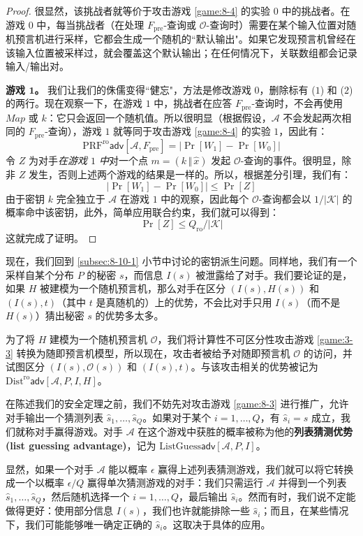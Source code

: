 \begin{proof}
\vspace{5pt}

\noindent
很显然，该挑战者就等价于攻击游戏 \ref{game:8-4} 的实验 $0$ 中的挑战者。在游戏 $0$ 中，每当挑战者（在处理 $F_\mathrm{pre}$-查询或 $\mathcal{O}$-查询时）需要在某个输入位置对随机预言机进行采样，它都会生成一个随机的``默认输出"。如果它发现预言机曾经在该输入位置被采样过，就会覆盖这个默认输出；在任何情况下，关联数组都会记录输入/输出对。

\vspace{5pt}

\noindent\textbf{游戏 $\mathbf{1}$。}
我们让我们的侏儒变得``健忘"，方法是修改游戏 $0$，删除标有 ($1$) 和 ($2$) 的两行。现在观察一下，在游戏 $1$ 中，挑战者在应答 $F_\mathrm{pre}$-查询时，不会再使用 $Map$ 或 $k$：它只会返回一个随机值。所以很明显（根据假设，$\mathcal{A}$ 不会发起两次相同的 $F_\mathrm{pre}$-查询），游戏 $1$ 就等同于攻击游戏 \ref{game:8-4} 的实验 $1$，因此有：
\[
\mathrm{PRF}^\mathrm{ro}\mathsf{adv}[\mathcal{A},F_\mathrm{pre}]=
\big\lvert
\Pr[W_1]-\Pr[W_0]
\big\rvert
\]
令 $Z$ 为对手\emph{在游戏 $1$ 中}对一个点 $m=(k\,\Vert\,\hat{x})$ 发起 $\mathcal{O}$-查询的事件。很明显，除非 $Z$ 发生，否则上述两个游戏的结果是一样的。所以，根据差分引理，我们有：
\[
\big\lvert
\Pr[W_1]-\Pr[W_0]
\big\rvert
\leq\Pr[Z]
\]
由于密钥 $k$ 完全独立于 $\mathcal{A}$ 在游戏 $1$ 中的观察，因此每个 $\mathcal{O}$-查询都会以 $1/|\mathcal{K}|$ 的概率命中该密钥，此外，简单应用联合约束，我们就可以得到：
\[
\Pr[Z]\leq
Q_\mathrm{ro}/|\mathcal{K}|
\]
这就完成了证明。
\end{proof}

\begin{snote}[随机预言机模型下的密钥派生。]
现在，我们回到 \ref{subsec:8-10-1} 小节中讨论的密钥派生问题。同样地，我们有一个采样自某个分布 $P$ 的秘密 $s$，而信息 $I(s)$ 被泄露给了对手。我们要论证的是，如果 $H$ 被建模为一个随机预言机，那么对手在区分 $(I(s),H(s))$ 和 $(I(s),t)$（其中 $t$ 是真随机的）上的优势，不会比对手只用 $I(s)$（而不是 $H(s)$）猜出秘密 $s$ 的优势多太多。

为了将 $H$ 建模为一个随机预言机 $\mathcal{O}$，我们将计算性不可区分性攻击游戏 \ref{game:3-3} 转换为随即预言机模型，所以现在，攻击者被给予对随即预言机 $\mathcal{O}$ 的访问，并试图区分 $(I(s),\mathcal{O}(s))$ 和 $(I(s),t)$。与该攻击相关的优势被记为 $\mathrm{Dist}^\mathrm{ro}\mathsf{adv}[\mathcal{A},P,I,H]$。

在陈述我们的安全定理之前，我们不妨先对攻击游戏 \ref{game:8-3} 进行推广，允许对手输出一个猜测列表 $\hat{s}_1,\dots,\hat{s}_Q$。如果对于某个 $i=1,\dots,Q$，有 $\hat{s}_i=s$ 成立，我们就称对手赢得游戏。对手 $\mathcal{A}$ 在这个游戏中获胜的概率被称为他的\textbf{列表猜测优势(list guessing advantage)}，记为 $\mathrm{ListGuess}\mathsf{adv}[\mathcal{A},P,I]$。

显然，如果一个对手 $\mathcal{A}$ 能以概率 $\epsilon$ 赢得上述列表猜测游戏，我们就可以将它转换成一个以概率 $\epsilon/Q$ 赢得单次猜测游戏的对手：我们只需运行 $\mathcal{A}$ 并得到一个列表 $\hat{s}_1,\dots,\hat{s}_Q$，然后随机选择一个 $i=1,\dots,Q$，最后输出 $\hat{s}_i$。然而有时，我们说不定能做得更好：使用部分信息 $I(s)$，我们也许就能排除一些 $\hat{s}_i$；而且，在某些情况下，我们可能能够唯一确定正确的 $\hat{s}_i$。这取决于具体的应用。
\end{snote}

